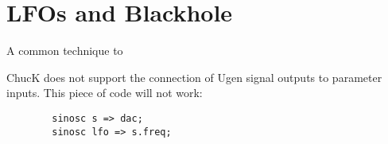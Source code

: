 \section{LFOs and Blackhole}

A common technique to

ChucK does not support the connection of Ugen signal outputs to parameter inputs. This piece of code will not work:

\begin{verbatim}
        sinosc s => dac;
        sinosc lfo => s.freq;
\end{verbatim}

